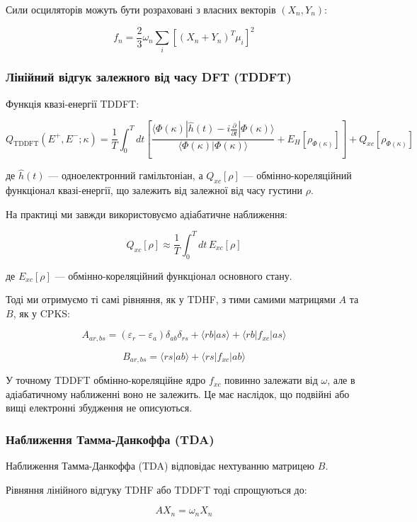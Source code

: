 \documentclass{PySCFBook}
\begin{document}
Сили осциляторів можуть бути розраховані з власних векторів \((X_n, Y_n)\):

\[f_n = \frac{2}{3} \omega_n \sum_i \left[ (X_n + Y_n)^T \mu_i \right]^2\]

\subsubsection{Лінійний відгук залежного від часу DFT (TDDFT)}

Функція квазі-енергії TDDFT:

\[Q_{\text{TDDFT}}(E^+, E^-; \kappa) = \frac{1}{T} \int_0^T dt \left[ \frac{\langle \Phi(\kappa) | \hat{h}(t) - i \frac{\partial}{\partial t} | \Phi(\kappa) \rangle}{\langle \Phi(\kappa) | \Phi(\kappa) \rangle} + E_H[\rho_{\Phi(\kappa)}] \right] + Q_{xc}[\rho_{\Phi(\kappa)}]\]

де \(\hat{h}(t)\) — одноелектронний гамільтоніан, а \(Q_{xc}[\rho]\) — обмінно-кореляційний функціонал квазі-енергії, що залежить від залежної від часу густини \(\rho\).

На практиці ми завжди використовуємо адіабатичне наближення:

\[Q_{xc}[\rho] \approx \frac{1}{T} \int_0^T dt \, E_{xc}[\rho]\]

де \(E_{xc}[\rho]\) — обмінно-кореляційний функціонал основного стану.

Тоді ми отримуємо ті самі рівняння, як у TDHF, з тими самими матрицями \(A\) та \(B\), як у CPKS:

\[A_{ar,bs} = (\varepsilon_r - \varepsilon_a) \delta_{ab} \delta_{rs} + \langle rb | as \rangle + \langle rb | f_{xc} | as \rangle\]

\[B_{ar,bs} = \langle rs | ab \rangle + \langle rs | f_{xc} | ab \rangle\]

У точному TDDFT обмінно-кореляційне ядро \(f_{xc}\) повинно залежати від \(\omega\), але в адіабатичному наближенні воно не залежить. Це має наслідок, що подвійні або вищі електронні збудження не описуються.

\subsubsection{Наближення Тамма-Данкоффа (TDA)}

Наближення Тамма-Данкоффа (TDA) відповідає нехтуванню матрицею \(B\).

Рівняння лінійного відгуку TDHF або TDDFT тоді спрощуються до:

\[A X_n = \omega_n X_n\]
\end{document}
